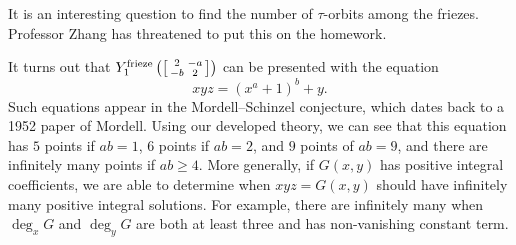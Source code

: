 \documentclass[../notes.tex]{subfiles}
\begin{document}
\begin{remark}
	It is an interesting question to find the number of $\tau$-orbits among the friezes. Professor Zhang has threatened to put this on the homework.
\end{remark}
\begin{example}
	It turns out that $Y_1^{\mathrm{frieze}}\left(\begin{bsmallmatrix}
		2 & -a \\ -b & 2
	\end{bsmallmatrix}\right)$ can be presented with the equation
	\[xyz=\left(x^a+1\right)^b+y.\]
	Such equations appear in the Mordell--Schinzel conjecture, which dates back to a 1952 paper of Mordell. Using our developed theory, we can see that this equation has $5$ points if $ab=1$, $6$ points if $ab=2$, and $9$ points of $ab=9$, and there are infinitely many points if $ab\ge4$. More generally, if $G(x,y)$ has positive integral coefficients, we are able to determine when $xyz=G(x,y)$ should have infinitely many positive integral solutions. For example, there are infinitely many when $\deg_xG$ and $\deg_yG$ are both at least three and has non-vanishing constant term.
\end{example}
\end{document}
